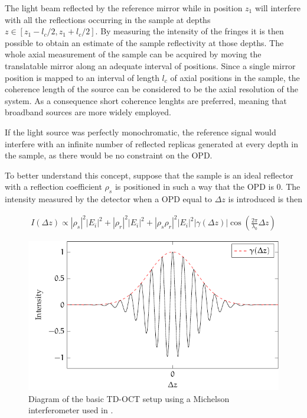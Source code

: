 The light beam reflected by the reference mirror while in position $z_1$ will interfere with all the reflections occurring in the sample at depths $z \in [z_1 - l_c/2, z_1 + l_c/2]$. By measuring the intensity of the fringes it is then possible to obtain an estimate of the sample reflectivity at those depths. The whole axial measurement of the sample can be acquired by moving the translatable mirror along an adequate interval of positions. Since a single mirror position is mapped to an interval of length $l_c$ of axial positions in the sample, the coherence length of the source can be considered to be the axial resolution of the system. As a consequence short coherence lenghts are preferred, meaning that broadband sources are more widely employed. 

If the light source was perfectly monochromatic, the reference signal would interfere with an infinite number of reflected replicas generated at every depth in the sample, as there would be no constraint on the \ac{OPD}. 


To better understand this concept, suppose that the sample is an ideal reflector with a reflection coefficient $\rho_s$ is positioned in such a way that the \ac{OPD} is 0. The intensity measured by the detector when a \ac{OPD} equal to $\Delta z$ is introduced is then

\begin{align}\label{eq:tdoct-interference}
I(\Delta z) \propto |\rho_s|^2 |E_i|^2 + |\rho_r|^2 |E_i|^2 + |\rho_s\rho_r|^2|E_i|^2|\gamma(\Delta z)|\cos\left(\frac{2\pi}{\lambda_0}\Delta z\right)
\end{align}


\begin{figure}[hbt]
	\myfloatalign
	\includegraphics[width=0.8\linewidth]{gfx/tikz/tdoct-signal}
	\caption{Diagram of the basic \ac{TD-OCT} setup using a Michelson interferometer used in \cite{Huang1991}.}\label{fig:tdoct-signal}
\end{figure}


